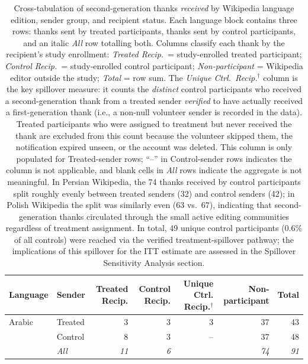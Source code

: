 \documentclass[9pt,twoside,lineno]{pnas-new}
\begin{document}
\clearpage
\begin{table}[ht]
\centering
\small
\caption{Cross-tabulation of second-generation thanks \emph{received} by Wikipedia language edition, sender group, and recipient status. Each language block contains three rows: thanks sent by treated participants, thanks sent by control participants, and an italic \emph{All} row totalling both. Columns classify each thank by the recipient's study enrollment: \textit{Treated Recip.}\ = study-enrolled treated participant; \textit{Control Recip.}\ = study-enrolled control participant; \textit{Non-participant} = Wikipedia editor outside the study; \textit{Total} = row sum. The \textit{Unique Ctrl.\ Recip.}$^\dagger$ column is the key spillover measure: it counts the \emph{distinct} control participants who received a second-generation thank from a treated sender \emph{verified} to have actually received a first-generation thank (i.e., a non-null volunteer sender is recorded in the data). Treated participants who were assigned to treatment but never received the thank are excluded from this count because the volunteer skipped them, the notification expired unseen, or the account was deleted. This column is only populated for Treated-sender rows; ``--'' in Control-sender rows indicates the column is not applicable, and blank cells in \emph{All} rows indicate the aggregate is not meaningful. In Persian Wikipedia, the 74 thanks received by control participants split roughly evenly between treated senders (32) and control senders (42); in Polish Wikipedia the split was similarly even (63 vs.\ 67), indicating that second-generation thanks circulated through the small active editing communities regardless of treatment assignment. In total, 49 unique control participants (0.6\% of all controls) were reached via the verified treatment-spillover pathway; the implications of this spillover for the ITT estimate are assessed in the Spillover Sensitivity Analysis section.}
\label{table:second-gen-received}
\begin{tabular}{ll rrrrr}
\toprule
\textbf{Language} & \textbf{Sender} & \textbf{Treated Recip.} & \textbf{Control Recip.} & \textbf{Unique Ctrl. Recip.}$^\dagger$ & \textbf{Non-participant} & \textbf{Total} \\
\midrule
Arabic & Treated &   3 &   3 &  3 &  37 &  43 \\
       & Control &   8 &   3 & -- &  37 &  48 \\
       & \textit{All} & \textit{11} & \textit{6} & & \textit{74} & \textit{91} \\

\end{tabular}
\end{table}
\end{document}
